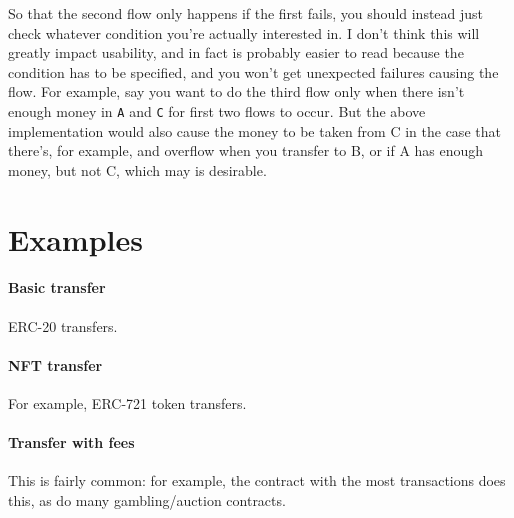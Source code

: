 \documentclass[10pt]{article}
\begin{document}
So that the second flow only happens if the first fails, you should instead just check whatever condition you're actually interested in.
I don't think this will greatly impact usability, and in fact is probably easier to read because the condition has to be specified, and you won't get unexpected failures causing the flow.
For example, say you want to do the third flow only when there isn't enough money in \lstinline{A} and \lstinline{C} for first two flows to occur.
But the above implementation would also cause the money to be taken from C in the case that there's, for example, and overflow when you transfer to B, or if A has enough money, but not C, which may is desirable.

\section{Examples}
\paragraph{Basic transfer} ERC-20 transfers.

\paragraph{NFT transfer}
For example, ERC-721 token transfers.


\paragraph{Transfer with fees}
This is fairly common: for example, the contract with the most transactions does this, as do many gambling/auction contracts.
\end{document}
